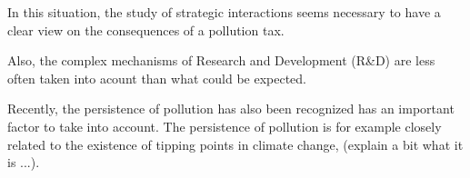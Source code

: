 \documentclass{article}
\begin{document}
In this situation, the study of strategic interactions seems necessary to have a clear view on the consequences of a pollution tax. 

Also, the complex mechanisms of Research and Development (R\&D) are less often taken into acount than what could be expected. 

Recently, the persistence of pollution has also been recognized has an important factor to take into account. The persistence of pollution is for example closely related to the existence of tipping points in climate change, (explain a bit what it is ...).
\end{document}
